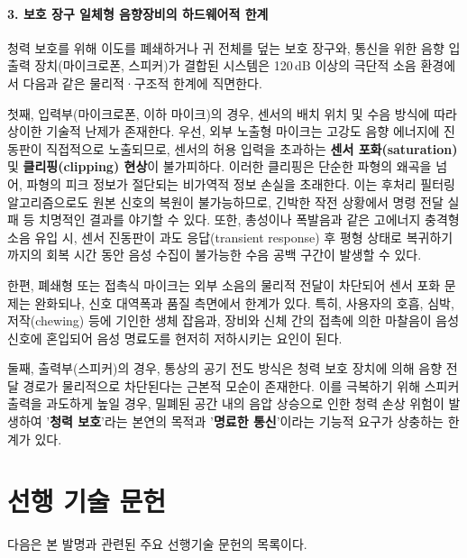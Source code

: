 \documentclass{article}
\begin{document}
\paragraph{3. 보호 장구 일체형 음향장비의 하드웨어적 한계}

청력 보호를 위해 이도를 폐쇄하거나 귀 전체를 덮는 보호 장구와, 통신을 위한 음향 입출력 장치(마이크로폰, 스피커)가 결합된 시스템은 120\,dB 이상의 극단적 소음 환경에서 다음과 같은 물리적·구조적 한계에 직면한다.

첫째, 입력부(마이크로폰, 이하 마이크)의 경우, 센서의 배치 위치 및 수음 방식에 따라 상이한 기술적 난제가 존재한다. 
우선, 외부 노출형 마이크는 고강도 음향 에너지에 진동판이 직접적으로 노출되므로, 센서의 허용 입력을 초과하는 \textbf{센서 포화(saturation)} 및 \textbf{클리핑(clipping) 현상}이 불가피하다. 
이러한 클리핑은 단순한 파형의 왜곡을 넘어, 파형의 피크 정보가 절단되는 비가역적 정보 손실을 초래한다. 
이는 후처리 필터링 알고리즘으로도 원본 신호의 복원이 불가능하므로, 긴박한 작전 상황에서 명령 전달 실패 등 치명적인 결과를 야기할 수 있다. 
또한, 총성이나 폭발음과 같은 고에너지 충격형 소음 유입 시, 센서 진동판이 과도 응답(transient response) 후 평형 상태로 복귀하기까지의 회복 시간 동안 음성 수집이 불가능한 수음 공백 구간이 발생할 수 있다.

한편, 폐쇄형 또는 접촉식 마이크는 외부 소음의 물리적 전달이 차단되어 센서 포화 문제는 완화되나, 신호 대역폭과 품질 측면에서 한계가 있다. 
특히, 사용자의 호흡, 심박, 저작(chewing) 등에 기인한 생체 잡음과, 장비와 신체 간의 접촉에 의한 마찰음이 음성 신호에 혼입되어 음성 명료도를 현저히 저하시키는 요인이 된다.

둘째, 출력부(스피커)의 경우, 통상의 공기 전도 방식은 청력 보호 장치에 의해 음향 전달 경로가 물리적으로 차단된다는 근본적 모순이 존재한다. 
이를 극복하기 위해 스피커 출력을 과도하게 높일 경우, 밀폐된 공간 내의 음압 상승으로 인한 청력 손상 위험이 발생하여 '\textbf{청력 보호}'라는 본연의 목적과 '\textbf{명료한 통신}'이라는 기능적 요구가 상충하는 한계가 있다.




\newpage
\section{선행 기술 문헌}

다음은 본 발명과 관련된 주요 선행기술 문헌의 목록이다.
\end{document}
